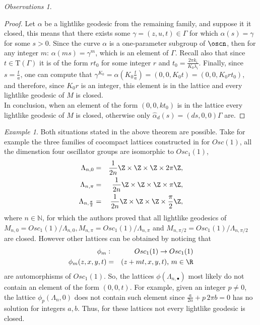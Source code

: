 \documentclass[11pt]{amsart}
\theoremstyle{plain}
\newtheorem{cor}[thm]{Corollary}
\theoremstyle{definition}
\theoremstyle{remark}
\newtheorem{exa}[thm]{Example}
\newtheorem{obs}[thm]{Observations}
\begin{document}
\begin{obs}
\begin{proof}
	Let $\alpha$ be a lightlike geodesic from the remaining family, and suppose it it closed, this means that there exists some $\gamma=(z,u,t) \in \Gamma$ for which $\alpha(s)=\gamma$ for some $s>0$. Since the curve $\alpha$ is a one-parameter subgroup of $\oscn$, then for any integer $m$: $\alpha(m s)=\gamma^m$, which is an element of $\Gamma$. Recall also that since $t \in \mathrm{T}(\Gamma)$ it is of the form $r t_0$ for some integer $r$ and $t_0=\frac{2 \pi k_i}{K_0 \lambda_i}$. Finally, since $s=\frac{t}{a}$, one can compute that $\gamma^{K_0} = \alpha(K_0 \frac{t}{a}) = (0,0,K_0 t) = (0,0,K_0 r t_0)$, and therefore, since $K_0 r$ is an integer, this element is in the lattice and every lightlike geodesic of $M$ is closed.\\
	
	In conclusion, when an element of the form $(0,0,k t_0)$ is in the lattice every lightlike geodesic of $M$ is closed, otherwise only $\hat{\alpha}_d(s)=(ds,0,0)\Gamma$ are.
	
\end{proof}

\begin{comment}
\begin{cor}
	Let $\Gamma$ be a cocompact lattice of $\oscn$, then the lightlike geodesics of $M=\oscn/\Gamma$ are all closed if and only if $\Gamma$ contains an element of the form $(0,0,t)$.
\end{cor}
\end{comment}


\begin{exa} Both situations stated in the above theorem are possible. Take for example the three families of cocompact lattices constructed in \cite{OV} for $Osc(1)$, all the dimenstion four oscillator groups are isomorphic to $Osc_1(1)$,
	\begin{eqnarray*} \label{geodlight}
		\Lambda_{n,0}&=&\frac{1}{2n}\Z \times \Z \times \Z \times 2 \pi \Z,\\
		\Lambda_{n,\pi}&=&\frac{1}{2n}\Z \times \Z \times \Z \times \pi \Z,\\
		\Lambda_{n,\frac{\pi}{2}}&=&\frac{1}{2n}\Z \times \Z \times \Z \times \frac{\pi}{2} \Z,
	\end{eqnarray*}
	where $n \in \mathbb{N}$, for which the authors proved that all lightlike geodesics of $M_{n,0}=Osc_1(1)/\Lambda_{n,0}, M_{n,\pi}=Osc_1(1)/\Lambda_{n,\pi}$ and $M_{n,\pi/2}=Osc_1(1)/\Lambda_{n,\pi/2}$ are closed. However other  lattices can be obtained by noticing that
	\begin{eqnarray*}
		\phi_m &:& Osc_1(1) \rightarrow Osc_1(1)\\
		\phi_m(z,x,y,t)&=&(z+mt,x,y,t) \textrm{,    $m \in \R$}
	\end{eqnarray*}
	are  automorphisms of $Osc_1(1)$. So, the  lattices $\phi(\Lambda_{n,\bullet})$ most likely do not contain an element of the form $(0,0, t)$. For example, given an integer $p \neq 0$, the lattice $\phi_p(\Lambda_n,0)$ does not contain such element since $\frac{a}{2 n}+ p \, 2 \pi b = 0$ has no solution for integers $a,b$. Thus, for these lattices not every lightlike geodesic is closed. \\
    

\end{exa}
\end{obs}
\end{document}
